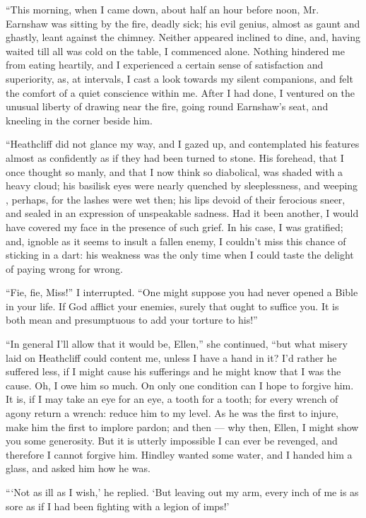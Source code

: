 \par “This morning, when I came down, about half an hour before noon, Mr. Earnshaw was sitting by the fire, deadly sick; his evil genius, almost as gaunt and ghastly, leant against the chimney. Neither appeared inclined to dine, and, having waited till all was cold on the table, I commenced alone. Nothing hindered me from eating heartily, and I experienced a certain sense of satisfaction and superiority, as, at intervals, I cast a look towards my silent companions, and felt the comfort of a quiet conscience within me. After I had done, I ventured on the unusual liberty of drawing near the fire, going round Earnshaw's seat, and kneeling in the corner beside him.
\par “Heathcliff did not glance my way, and I gazed up, and contemplated his features almost as confidently as if they had been turned to stone. His forehead, that I once thought so manly, and that I now think so diabolical, was shaded with a heavy cloud; his basilisk eyes were nearly quenched by sleeplessness, and weeping , perhaps, for the lashes were wet then; his lips devoid of their ferocious sneer, and sealed in an expression of unspeakable sadness. Had it been another, I would have covered my face in the presence of such grief. In his case, I was gratified; and, ignoble as it seems to insult a fallen enemy, I couldn't miss this chance of sticking in a dart: his weakness was the only time when I could taste the delight of paying wrong for wrong.
\par “Fie, fie, Miss!” I interrupted. “One might suppose you had never opened a Bible in your life. If God afflict your enemies, surely that ought to suffice you. It is both mean and presumptuous to add your torture to his!”
\par “In general I'll allow that it would be, Ellen,” she continued, “but what misery laid on Heathcliff could content me, unless I have a hand in it? I'd rather he suffered less, if I might cause his sufferings and he might know that I was the cause. Oh, I owe him so much. On only one condition can I hope to forgive him. It is, if I may take an eye for an eye, a tooth for a tooth; for every wrench of agony return a wrench: reduce him to my level. As he was the first to injure, make him the first to implore pardon; and then — why then, Ellen, I might show you some generosity. But it is utterly impossible I can ever be revenged, and therefore I cannot forgive him. Hindley wanted some water, and I handed him a glass, and asked him how he was.
\par “‘Not as ill as I wish,’ he replied. ‘But leaving out my arm, every inch of me is as sore as if I had been fighting with a legion of imps!’
